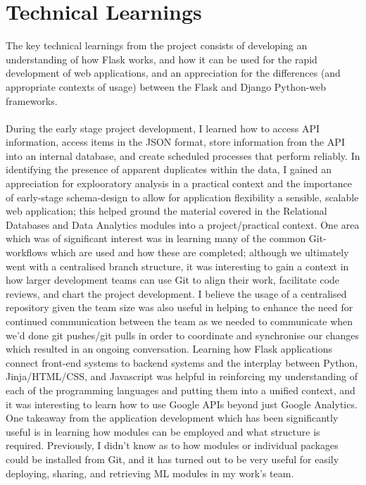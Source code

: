 \documentclass{scrreprt}
\begin{document}
\section{Technical Learnings}\label{LrnTech}
The key technical learnings from the project consists of developing an understanding of how Flask works, and how it can be used for the rapid development of web applications, and an appreciation for the differences (and appropriate contexts of usage) between the Flask and Django Python-web frameworks. \\
\\
During the early stage project development, I learned how to access API information, access items in the JSON format, store information from the API into an internal database, and create scheduled processes that perform reliably. In identifying the presence of apparent duplicates within the data, I gained an appreciation for explooratory analysis in a practical context and the importance of early-stage schema-design to allow for application flexibility a sensible, scalable web application; this helped ground the material covered in the Relational Databases and Data Analytics modules into a project/practical context. One area which was of significant interest was in learning many of the common Git-workflows which are used and how these are completed; although we ultimately went with a centralised branch structure, it was interesting to gain a context in how larger development teams can use Git to align their work, facilitate code reviews, and chart the project development. I believe the usage of a centralised repository given the team size was also useful in helping to enhance the need for continued communication between the team as we needed to communicate when we'd done git pushes/git pulls in order to coordinate and synchronise our changes which resulted in an ongoing conversation. Learning how Flask applications connect front-end systems to backend systems and the interplay between Python, Jinja/HTML/CSS, and Javascript was helpful in reinforcing my understanding of each of the programming languages and putting them into a unified context, and it was interesting to learn how to use Google APIs beyond just Google Analytics. One takeaway from the application development which has been significantly useful is in learning how modules can be employed and what structure is required. Previously, I didn't know as to how modules or individual packages could be installed from Git, and it has turned out to be very useful for easily deploying, sharing, and retrieving ML modules in my work's team.\\
\end{document}

